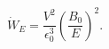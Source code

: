 \begin{equation} \label{Espeed}
\dot W_E = \frac{V^2}{\epsilon_{0}^3}\left(\frac{B_0}{E}\right)^2.
\end{equation}

